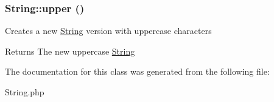 \hypertarget{classString_a07d720a3ea80bbc85f7424d2d7c27701}{
\subsubsection[{upper}]{\setlength{\rightskip}{0pt plus 5cm}String::upper ()}}
\label{classString_a07d720a3ea80bbc85f7424d2d7c27701}
Creates a new \hyperlink{classString}{String} version with uppercase characters \begin{DoxyReturn}{Returns}
The new uppercase \hyperlink{classString}{String} 
\end{DoxyReturn}


The documentation for this class was generated from the following file:\begin{DoxyCompactItemize}
\item 
String.php\end{DoxyCompactItemize}
